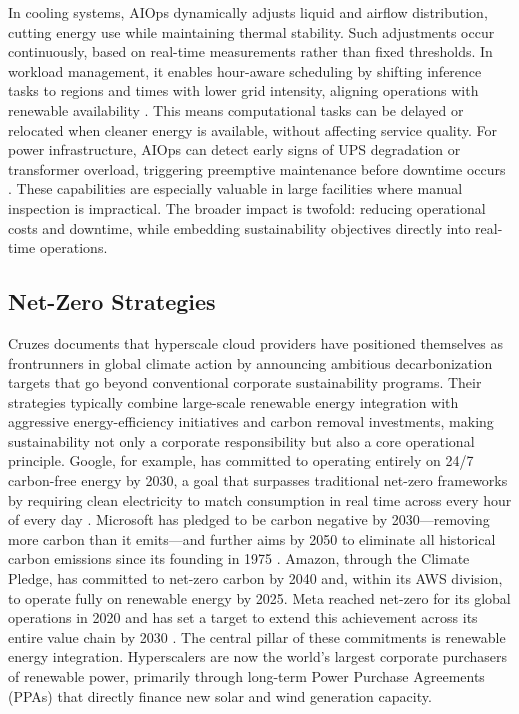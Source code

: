 \documentclass[conference]{IEEEtran}
\begin{document}
In cooling systems, AIOps dynamically adjusts liquid and airflow distribution, cutting energy use while maintaining thermal stability. Such adjustments occur continuously, based on real-time measurements rather than fixed thresholds. In workload management, it enables hour-aware scheduling by shifting inference tasks to regions and times with lower grid intensity, aligning operations with renewable availability \cite{Moore2025}. This means computational tasks can be delayed or relocated when cleaner energy is available, without affecting service quality. For power infrastructure, AIOps can detect early signs of UPS degradation or transformer overload, triggering preemptive maintenance before downtime occurs \cite{Cruzes2026}. These capabilities are especially valuable in large facilities where manual inspection is impractical. The broader impact is twofold: reducing operational costs and downtime, while embedding sustainability objectives directly into real-time operations.

\subsection{Net-Zero Strategies}

Cruzes \cite{Cruzes2026} documents that hyperscale cloud providers have positioned themselves as frontrunners in global climate action by announcing ambitious decarbonization targets that go beyond conventional corporate sustainability programs. Their strategies typically combine large-scale renewable energy integration with aggressive energy-efficiency initiatives and carbon removal investments, making sustainability not only a corporate responsibility but also a core operational principle. Google, for example, has committed to operating entirely on 24/7 carbon-free energy by 2030, a goal that surpasses traditional net-zero frameworks by requiring clean electricity to match consumption in real time across every hour of every day \cite{Cruzes2026}. Microsoft has pledged to be carbon negative by 2030---removing more carbon than it emits---and further aims by 2050 to eliminate all historical carbon emissions since its founding in 1975 \cite{Cruzes2026}. Amazon, through the Climate Pledge, has committed to net-zero carbon by 2040 and, within its AWS division, to operate fully on renewable energy by 2025. Meta reached net-zero for its global operations in 2020 and has set a target to extend this achievement across its entire value chain by 2030 \cite{Cruzes2026}. The central pillar of these commitments is renewable energy integration. Hyperscalers are now the world's largest corporate purchasers of renewable power, primarily through long-term Power Purchase Agreements (PPAs) that directly finance new solar and wind generation capacity.
\end{document}
